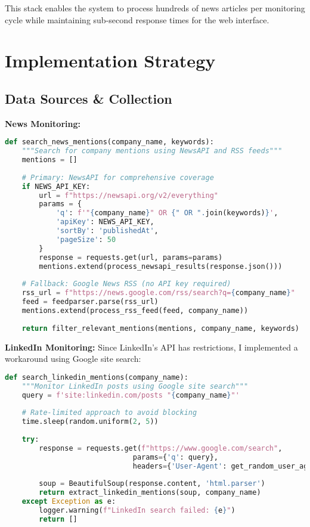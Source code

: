 \documentclass[11pt]{article}
\begin{document}
This stack enables the system to process hundreds of news articles per monitoring cycle while maintaining sub-second response times for the web interface.

\section{Implementation Strategy}

\subsection{Data Sources \& Collection}

\textbf{News Monitoring:}
\begin{lstlisting}[language=Python, caption=News API Integration]
def search_news_mentions(company_name, keywords):
    """Search for company mentions using NewsAPI and RSS feeds"""
    mentions = []
    
    # Primary: NewsAPI for comprehensive coverage
    if NEWS_API_KEY:
        url = f"https://newsapi.org/v2/everything"
        params = {
            'q': f'"{company_name}" OR {" OR ".join(keywords)}',
            'apiKey': NEWS_API_KEY,
            'sortBy': 'publishedAt',
            'pageSize': 50
        }
        response = requests.get(url, params=params)
        mentions.extend(process_newsapi_results(response.json()))
    
    # Fallback: Google News RSS (no API key required)
    rss_url = f"https://news.google.com/rss/search?q={company_name}"
    feed = feedparser.parse(rss_url)
    mentions.extend(process_rss_feed(feed, company_name))
    
    return filter_relevant_mentions(mentions, company_name, keywords)
\end{lstlisting}

\textbf{LinkedIn Monitoring:}
Since LinkedIn's API has restrictions, I implemented a workaround using Google site search:

\begin{lstlisting}[language=Python, caption=LinkedIn Monitoring via Google Search]
def search_linkedin_mentions(company_name):
    """Monitor LinkedIn posts using Google site search"""
    query = f'site:linkedin.com/posts "{company_name}"'
    
    # Rate-limited approach to avoid blocking
    time.sleep(random.uniform(2, 5))
    
    try:
        response = requests.get(f"https://www.google.com/search", 
                              params={'q': query}, 
                              headers={'User-Agent': get_random_user_agent()})
        
        soup = BeautifulSoup(response.content, 'html.parser')
        return extract_linkedin_mentions(soup, company_name)
    except Exception as e:
        logger.warning(f"LinkedIn search failed: {e}")
        return []
\end{lstlisting}
\end{document}
